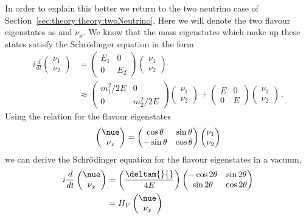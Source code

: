 In order to explain this better we return to the two neutrino case of Section~\ref{sec:theory:theory:twoNeutrino}.
Here we will denote the two flavour eigenstates as \nue and $\nu_{x}$.
We know that the mass eigenstates which make up these states satisfy the Schr\"odinger equation in the form
\begin{align}
  i \frac{d}{dt}
  \begin{pmatrix}
    \nu_{1} \\
    \nu_{2}
  \end{pmatrix}
  &=
  \begin{pmatrix}
    E_{1} & 0 \\
    0     & E_{2}
  \end{pmatrix}
  \begin{pmatrix}
    \nu_{1} \\
    \nu_{2}
  \end{pmatrix} \\
  & \approx
  \begin{pmatrix}
    m_{1}^{2}/2E & 0 \\
    0 & m_{2}^{2}/2E
  \end{pmatrix}
  \begin{pmatrix}
    \nu_{1} \\
    \nu_{2}
  \end{pmatrix}
  +
  \begin{pmatrix}
    E & 0 \\
    0 & E 
  \end{pmatrix}
  \begin{pmatrix}
    \nu_{1} \\
    \nu_{2}
  \end{pmatrix} \, .  
\end{align}
Using the relation for the flavour eigenstates
\begin{equation}
  \begin{pmatrix}
    \nue \\
    \nu_{x}
  \end{pmatrix}
  =
  \begin{pmatrix}
    \cos\theta & \sin\theta \\
    -\sin\theta & \cos\theta
  \end{pmatrix}
  \begin{pmatrix}
    \nu_{1} \\
    \nu_{2}
  \end{pmatrix}
\end{equation}
we can derive the Schr\"odinger equation for the flavour eigenstates in a vacuum,
\begin{align}
  i \frac{d}{dt}
  \begin{pmatrix}
    \nue \\ \nu_{x}
  \end{pmatrix}
  &=
  \left( \frac{\deltam{}{}}{4E} \right)
  \begin{pmatrix}
    -\cos 2\theta & \sin 2\theta \\
    \sin 2\theta & \cos 2\theta
  \end{pmatrix} \\
  &=
  H_{V}
  \begin{pmatrix} \nue \\ \nu_{x} \end{pmatrix}
\end{align}
